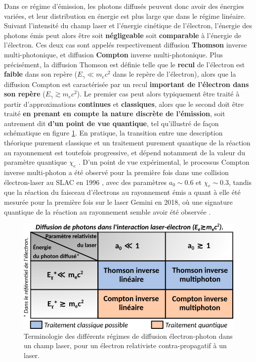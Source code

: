 \begin{refsection}
Dans ce régime d'émission, les photons diffusés peuvent donc avoir des énergies variées, et leur distribution en énergie est plus large que dans le régime linéaire. Suivant l'intensité du champ laser et l'énergie cinétique de l'électron, l'énergie des photons émis peut alors être soit \textbf{négligeable} soit \textbf{comparable} à l'énergie de l'électron. Ces deux cas sont appelés respectivement diffusion \textbf{Thomson} inverse multi-photonique, et diffusion \textbf{Compton} inverse multi-photonique. Plus précisément, la diffusion Thomson est définie telle que le \textbf{recul} de l'électron est \textbf{faible} dans son repère ($E_\gamma \ll m_e c^2$ dans le repère de l'électron), alors que la diffusion Compton est caractérisée par un recul \textbf{important de l'électron dans son repère} ($E_\gamma \gtrsim m_e c^2$). Le premier cas peut alors typiquement être traité à partir d'approximations \textbf{continues} et \textbf{classiques}, alors que le second doit être traité \textbf{en prenant en compte la nature discrète de l'émission}, soit autrement dit \textbf{d'un point de vue quantique}, tel qu'illustré de façon schématique en figure \ref{fig:2-regimes_diffusion}. En pratique, la transition entre une description théorique purement classique et un traitement purement quantique de la réaction au rayonnement est toutefois progressive, et dépend notamment de la valeur du paramètre quantique $\chi_e$ \parencite{burton_2014, dipiazza_2012, niel_2018}. D'un point de vue expérimental, le processus Compton inverse multi-photon a été observé pour la première fois dans une collision électron-laser au SLAC en 1996 \parencite{bula_1996}, avec des paramètres $a_0 \sim 0.6$ et $\chi_e \sim 0.3$, tandis que la réaction du faisceau d'électrons au rayonnement émis a quant à elle été mesurée pour la première fois sur le laser Gemini en 2018, où une signature quantique de la réaction au rayonnement semble avoir été observée \parencite{cole_2018a, poder_2018}.

\begin{figure}[hbtp]
    \centering
    \includegraphics[width=0.7\linewidth]{2-laser/diffusion_electron-laser.png}
    \caption{Terminologie des différents régimes de diffusion électron-photon dans un champ laser, pour un électron relativiste contra-propagatif à un laser.}
    \label{fig:2-regimes_diffusion}
\end{figure}


\end{refsection}
